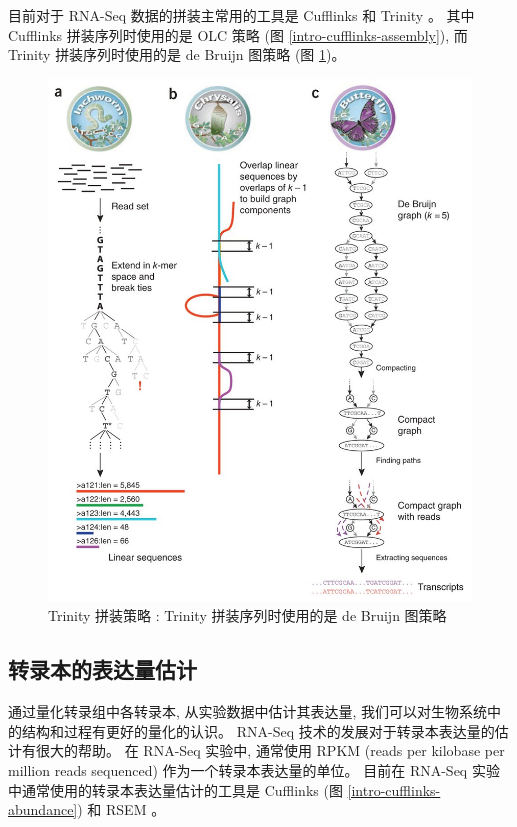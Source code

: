 目前对于 RNA-Seq 数据的拼装主常用的工具是 
Cufflinks \cite{cufflinks.2010} 和 Trinity \cite{grabherr2011full}。
其中 Cufflinks 拼装序列时使用的是 OLC 策略 (图 \ref{intro-cufflinks-assembly}), 
而 Trinity \cite{grabherr2011full} 拼装序列时使用的是 
de Bruijn 图策略 (图 \ref{intro-trinity-assembly})。

\begin{figure}[!t]
\centering
\includegraphics[width=\textwidth]{figures/trinity-assembly.jpg}
\caption[Trinity 拼装策略 \cite{grabherr2011full}]
{Trinity 拼装策略 \cite{grabherr2011full}: Trinity 拼装序列时使用的是 
de Bruijn 图策略}
\label{intro-trinity-assembly}
\end{figure}

\subsection{转录本的表达量估计}
通过量化转录组中各转录本, 从实验数据中估计其表达量, 
我们可以对生物系统中的结构和过程有更好的量化的认识。 
RNA-Seq 技术的发展对于转录本表达量的估计有很大的帮助。 
在 RNA-Seq 实验中, 
通常使用 RPKM (reads per kilobase per million reads sequenced) 
\cite{mortazavi2008mapping} 作为一个转录本表达量的单位。 
目前在 RNA-Seq 实验中通常使用的转录本表达量估计的工具是 
Cufflinks \cite{cufflinks.2010} (图 \ref{intro-cufflinks-abundance})
和 RSEM \cite{li2011rsem}。

